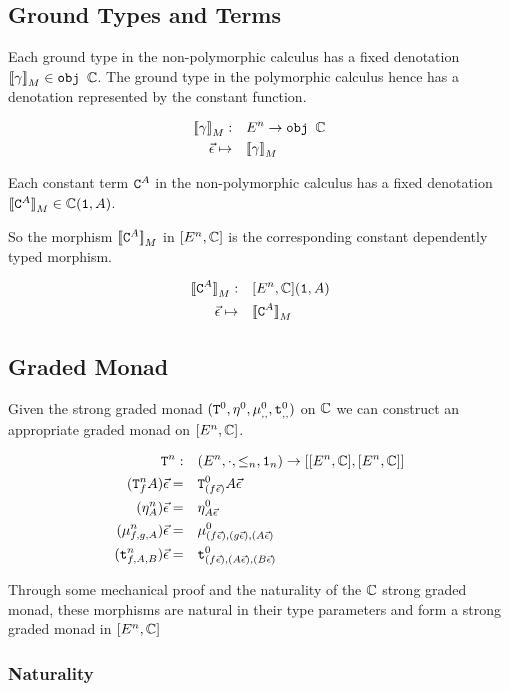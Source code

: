 \documentclass{report}
\newcommand{\Tz}[2]{\texttt{T}^0_{#1}#2}
\newcommand{\Tn}[2]{\texttt{T}^n_{#1}#2}
\newcommand{\pointz}[1]{\point{#1}^0}
\newcommand{\pointn}[1]{\point{#1}^n}
\newcommand{\bindz}[3]{\bind{#1}{#2}{#3}^0}
\newcommand{\bindn}[3]{\bind{#1}{#2}{#3}^n}
\newcommand\tstrengthz[3]{\tstrength{#1}{#2}{#3}^0}
\newcommand\tstrengthn[3]{\tstrength{#1}{#2}{#3}^n}
\newcommand\ev[0]{\vec{\e}}
\begin{document}
\subsection{Ground Types and Terms}
Each ground type in the non-polymorphic calculus has a fixed denotation ${\bf [\![}\gamma{\bf ]\!]}_M\in\texttt{obj }\mathbb{C}$. The ground type in the polymorphic calculus hence has a denotation represented by the constant function.

\begin{align}
    \deno{\g}:&\quad E^n\rightarrow \obj\C\\
    \ev \mapsto&\quad  \deno{\g}\\
\end{align}

Each constant term $\texttt{C}^{A}$ in the non-polymorphic calculus has a fixed denotation ${\bf [\![}\texttt{C}^{A}{\bf ]\!]}_M\in\mathbb{C}(\texttt{1}, A)$.

So the morphism ${\bf [\![}\texttt{C}^{A}{\bf ]\!]}_M$ in $[E^n, \mathbb{C}]$ is the corresponding constant dependently typed morphism.

\begin{align}
    \deno{\const{A}}:&\quad[E^n, \C](\1, A)\\
    \ev\mapsto&\quad\deno{\const{A}}
\end{align}

\subsection{Graded Monad}
Given the strong graded monad $(\Tz{}{}, \pointz{}{}{}, \bindz{}{}{}, \tstrengthz{}{}{})$ on $\mathbb{C}$ we can construct an appropriate graded monad on $[E^n, \mathbb{C}]$.

\begin{align}
    \Tn{}{}:&\quad(E^n, \dot, \subeffect_n, \1_n) \rightarrow [[E^n, \C], [E^n, \C]]\\
    (\Tn{f}{A})\ev=&\quad \Tz{(f\ev)}{A\ev}\\
    (\pointn{A})\ev=&\quad\pointz{A\ev}\\
    (\bindn{f}{g}{A})\ev=&\quad\bindz{(f\ev)}{(g\ev)}{(A\ev)}\\
    (\tstrengthn{f}{A}{B})\ev=&\quad\tstrengthz{(f\ev)}{(A\ev)}{(B\ev)}
\end{align}

Through some mechanical proof and the naturality of the $\mathbb{C}$ strong graded monad, these morphisms are natural in their type parameters and form a strong graded monad in $[E^n, \mathbb{C}]$


\subsubsection{Naturality}
\end{document}
